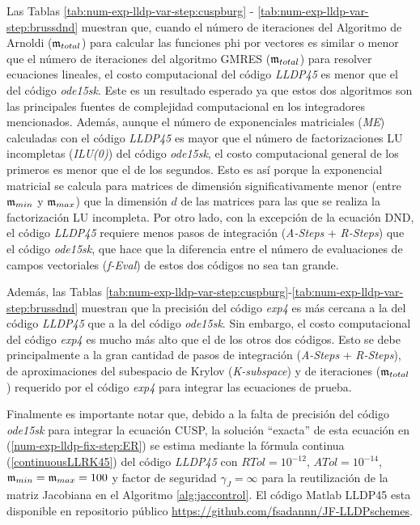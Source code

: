 Las Tablas \ref{tab:num-exp-lldp-var-step:cuspburg} - \ref{tab:num-exp-lldp-var-step:brussdnd} muestran que, cuando el número de iteraciones del Algoritmo de Arnoldi ($\mathfrak{m}_{total}$) para calcular las funciones phi por vectores es similar o menor que el número de iteraciones del algoritmo GMRES ($\mathfrak{m}_{total}$) para resolver ecuaciones lineales, el costo computacional del código \emph{LLDP45} es menor que el del código \emph{ode15sk}. Este es un resultado esperado ya que estos dos algoritmos son las principales fuentes de complejidad computacional en los integradores mencionados. Además, aunque el número de exponenciales matriciales (\textit{ME}) calculadas con el código \emph{LLDP45} es mayor que el número de factorizaciones LU incompletas (\textit{ILU(0)}) del código \emph{ode15sk}, el costo computacional general de los primeros es menor que el de los segundos. Esto es así porque la exponencial matricial se calcula para matrices de dimensión significativamente menor (entre $\mathfrak{m}_{min}$ y $\mathfrak{m}_{max}$) que la dimensión $d$ de las matrices para las que se realiza la factorización LU incompleta. Por otro lado, con la excepción de la ecuación DND, el código \emph{LLDP45} requiere menos pasos de integración (\textit{A-Steps} + \textit{R-Steps}) que el código \emph{ode15sk}, que hace que la diferencia entre el número de evaluaciones de campos vectoriales (\textit{f-Eval}) de estos dos códigos no sea tan grande.

Además, las Tablas \ref{tab:num-exp-lldp-var-step:cuspburg}-\ref{tab:num-exp-lldp-var-step:brussdnd} muestran que la precisión del código \emph{exp4} es más cercana a la del código \emph{LLDP45} que a la del código \emph{ode15sk}. Sin embargo, el costo computacional del código \emph{exp4} es mucho más alto que el de los otros dos códigos. Esto se debe principalmente a la gran cantidad de pasos de integración (\textit{A-Steps} + \textit{R-Steps}), de aproximaciones del subespacio de Krylov (\textit{K-subspace}) y de iteraciones ($\mathfrak{m}_ {total}$) requerido por el código \emph{exp4} para integrar las ecuaciones de prueba.

Finalmente es importante notar que, debido a la falta de precisión del código \emph{ode15sk} para integrar la ecuación CUSP, la solución ``exacta'' de esta ecuación en (\ref{num-exp-lldp-fix-step:ER}) se estima mediante la fórmula continua (\ref{continuousLLRK45}) del código \emph{LLDP45} con $RTol = 10^{-12}$, $ATol = 10^{-14}$, $\mathfrak{m}_{min} = \mathfrak{m}_{max} = 100$ y factor de seguridad $\gamma_J=\infty$ para la reutilización de la matriz Jacobiana en el Algoritmo \ref{alg:jaccontrol}. El código Matlab LLDP45 esta disponible en repositorio público \url{https://github.com/fsadannn/JF-LLDPschemes}.

